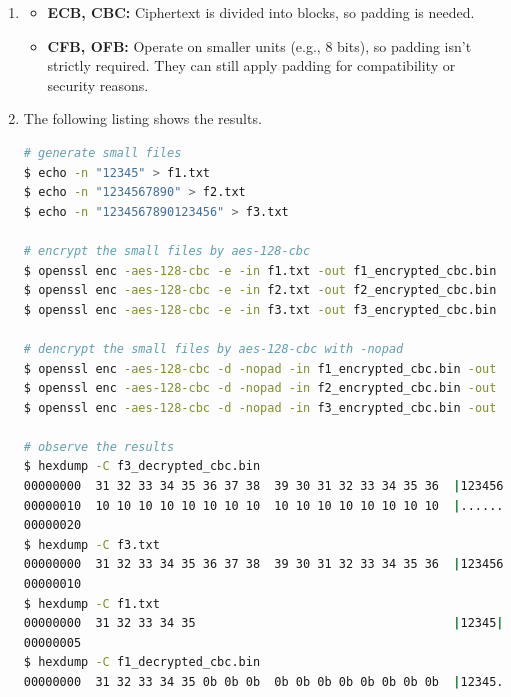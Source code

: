 \documentclass[a4paper]{article}
\begin{document}
\begin{enumerate}
    \item \begin{itemize}
        \item \textbf{ECB, CBC:} Ciphertext is divided into blocks, so padding is needed.
        \item \textbf{CFB, OFB:} Operate on smaller units (e.g., 8 bits), so padding isn't strictly required. They can still apply padding for compatibility or security reasons.
      \end{itemize}
    \item The following listing shows the results.
\begin{lstlisting}[caption={TASK\ 2.4\ Command\ Lines},label={lst:task2.4},language=BASH,breaklines=true]
# generate small files
$ echo -n "12345" > f1.txt
$ echo -n "1234567890" > f2.txt
$ echo -n "1234567890123456" > f3.txt

# encrypt the small files by aes-128-cbc
$ openssl enc -aes-128-cbc -e -in f1.txt -out f1_encrypted_cbc.bin -K 00112233445566778889aabbccddeeff -iv 0102030405060708
$ openssl enc -aes-128-cbc -e -in f2.txt -out f2_encrypted_cbc.bin -K 00112233445566778889aabbccddeeff -iv 0102030405060708
$ openssl enc -aes-128-cbc -e -in f3.txt -out f3_encrypted_cbc.bin -K 00112233445566778889aabbccddeeff -iv 0102030405060708

# dencrypt the small files by aes-128-cbc with -nopad
$ openssl enc -aes-128-cbc -d -nopad -in f1_encrypted_cbc.bin -out f1_decrypted_cbc.bin -K 00112233445566778889aabbccddeeff -iv 0102030405060708
$ openssl enc -aes-128-cbc -d -nopad -in f2_encrypted_cbc.bin -out f2_decrypted_cbc.bin -K 00112233445566778889aabbccddeeff -iv 0102030405060708
$ openssl enc -aes-128-cbc -d -nopad -in f3_encrypted_cbc.bin -out f3_decrypted_cbc.bin -K 00112233445566778889aabbccddeeff -iv 0102030405060708

# observe the results
$ hexdump -C f3_decrypted_cbc.bin
00000000  31 32 33 34 35 36 37 38  39 30 31 32 33 34 35 36  |1234567890123456|
00000010  10 10 10 10 10 10 10 10  10 10 10 10 10 10 10 10  |................|
00000020
$ hexdump -C f3.txt
00000000  31 32 33 34 35 36 37 38  39 30 31 32 33 34 35 36  |1234567890123456|
00000010
$ hexdump -C f1.txt
00000000  31 32 33 34 35                                    |12345|
00000005
$ hexdump -C f1_decrypted_cbc.bin
00000000  31 32 33 34 35 0b 0b 0b  0b 0b 0b 0b 0b 0b 0b 0b  |12345...........|
\end{lstlisting}
\end{enumerate}
\end{document}
